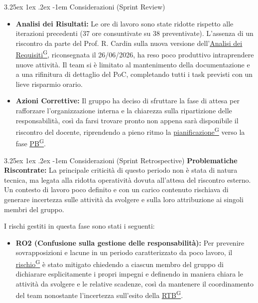 \documentclass[a4paper,12pt]{article}
\makeatletter
\renewcommand\paragraph{\@startsection{paragraph}{5}{\z@}%
  {3.25ex \@plus1ex \@minus.2ex}%
  {-1em}%
  {\normalfont\normalsize\bfseries}}
\providecommand{\glslink}[2]{\href{https://alittlebyte-19.github.io/Documentazione/glossario.html\#gls-#1}{\underline{#2}\textsuperscript{\scriptsize G}}}
\makeatother
\begin{document}
\paragraph{Considerazioni (Sprint Review)}
\begin{itemize}
    \item \textbf{Analisi dei Risultati:} Le ore di lavoro sono state ridotte rispetto alle iterazioni precedenti (37 ore consuntivate su 38 preventivate). L'assenza di un riscontro da parte del Prof. R. Cardin sulla nuova versione dell'\glslink{analisi-dei-requisiti-adr}{Analisi dei Requisiti}, riconsegnata il 26/06/2026, ha reso poco produttivo intraprendere nuove attività. Il team si è limitato al mantenimento della documentazione e a una rifinitura di dettaglio del PoC, completando tutti i task previsti con un lieve risparmio orario.
    \item \textbf{Azioni Correttive:} Il gruppo ha deciso di sfruttare la fase di attesa per rafforzare l'organizzazione interna e la chiarezza sulla ripartizione delle responsabilità, così da farsi trovare pronto non appena sarà disponibile il riscontro del docente, riprendendo a pieno ritmo la \glslink{pianificazione}{pianificazione} verso la fase \glslink{pb-product-baseline}{PB}.
\end{itemize}

\paragraph{Considerazioni (Sprint Retrospective)}
\textbf{Problematiche Riscontrate:} La principale criticità di questo periodo non è stata di natura tecnica, ma legata alla ridotta operatività dovuta all'attesa del riscontro esterno. Un contesto di lavoro poco definito e con un carico contenuto rischiava di generare incertezza sulle attività da svolgere e sulla loro attribuzione ai singoli membri del gruppo.

I rischi gestiti in questa fase sono stati i seguenti:
\begin{itemize}
    \item \textbf{RO2 (Confusione sulla gestione delle responsabilità):} Per prevenire sovrapposizioni e lacune in un periodo caratterizzato da poco lavoro, il \glslink{rischio}{rischio} è stato mitigato chiedendo a ciascun membro del gruppo di dichiarare esplicitamente i propri impegni e definendo in maniera chiara le attività da svolgere e le relative scadenze, così da mantenere il coordinamento del team nonostante l'incertezza sull'esito della \glslink{rtb-requirements-and-technology-baseline}{RTB}.
\end{itemize}
\end{document}
